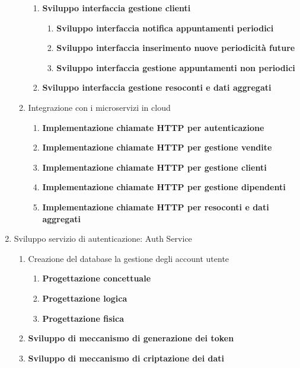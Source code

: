 \documentclass{article}
\begin{document}
\begin{enumerate}
\begin{enumerate}
\begin{enumerate}
                \item \textbf{Sviluppo interfaccia gestione clienti}
                \begin{enumerate}
                    \item \textbf{Sviluppo interfaccia notifica appuntamenti periodici}
                    \item \textbf{Sviluppo interfaccia inserimento nuove periodicità future}
                    \item \textbf{Sviluppo interfaccia gestione appuntamenti non periodici}
                \end{enumerate}
                \item \textbf{Sviluppo interfaccia gestione resoconti e dati aggregati}
            \end{enumerate}
            \item Integrazione con i microservizi in cloud
            \begin{enumerate}
                \item \textbf{Implementazione chiamate HTTP per autenticazione}
                \item \textbf{Implementazione chiamate HTTP per gestione vendite}
                \item \textbf{Implementazione chiamate HTTP per gestione clienti}
                \item \textbf{Implementazione chiamate HTTP per gestione dipendenti}
                \item \textbf{Implementazione chiamate HTTP per resoconti e dati aggregati}
            \end{enumerate}
        \end{enumerate}
        \item Sviluppo servizio di autenticazione: Auth Service
        \begin{enumerate}
            \item Creazione del database la gestione degli account utente
            \begin{enumerate}
                \item \textbf{Progettazione concettuale}
                \item \textbf{Progettazione logica}
                \item \textbf{Progettazione fisica}
            \end{enumerate}
            \item \textbf{Sviluppo di meccanismo di generazione dei token}
            \item \textbf{Sviluppo di meccanismo di criptazione dei dati}

\end{enumerate}
\end{enumerate}
\end{document}
